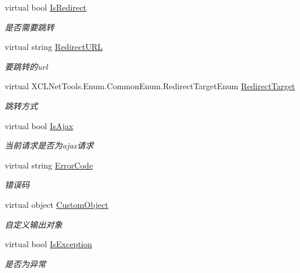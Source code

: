\begin{DoxyCompactItemize}
virtual bool \hyperlink{class_x_c_l_net_tools_1_1_message_1_1_message_model_af7a1590f9d2745c3db1486cb39edc070}{Is\+Redirect}
\begin{DoxyCompactList}\small\item\em 是否需要跳转 \end{DoxyCompactList}\item 
virtual string \hyperlink{class_x_c_l_net_tools_1_1_message_1_1_message_model_a571c6e0204605733f900eb3f906e038d}{Redirect\+U\+RL}
\begin{DoxyCompactList}\small\item\em 要跳转的url \end{DoxyCompactList}\item 
virtual X\+C\+L\+Net\+Tools.\+Enum.\+Common\+Enum.\+Redirect\+Target\+Enum \hyperlink{class_x_c_l_net_tools_1_1_message_1_1_message_model_a318553f7c9db2b2c685e4944feb2901e}{Redirect\+Target}
\begin{DoxyCompactList}\small\item\em 跳转方式 \end{DoxyCompactList}\item 
virtual bool \hyperlink{class_x_c_l_net_tools_1_1_message_1_1_message_model_a1ea24cc20f05516f6266af92cc06479a}{Is\+Ajax}
\begin{DoxyCompactList}\small\item\em 当前请求是否为ajax请求 \end{DoxyCompactList}\item 
virtual string \hyperlink{class_x_c_l_net_tools_1_1_message_1_1_message_model_ab169d7bab20868e935d775459b72e625}{Error\+Code}
\begin{DoxyCompactList}\small\item\em 错误码 \end{DoxyCompactList}\item 
virtual object \hyperlink{class_x_c_l_net_tools_1_1_message_1_1_message_model_a8065226d89965a09b9ff8e69ba9974ca}{Custom\+Object}
\begin{DoxyCompactList}\small\item\em 自定义输出对象 \end{DoxyCompactList}\item 
virtual bool \hyperlink{class_x_c_l_net_tools_1_1_message_1_1_message_model_a2978a2953053a69008890758e419a1b3}{Is\+Exception}
\begin{DoxyCompactList}\small\item\em 是否为异常 \end{DoxyCompactList}\end{DoxyCompactItemize}


